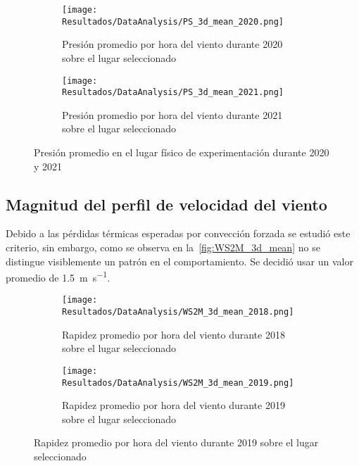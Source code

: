 			\begin{figure}[H]
				\centering
				\begin{subfigure}[t]{0.45\linewidth}
					\centering
					\texttt{[image: Resultados/DataAnalysis/PS\_3d\_mean\_2020.png]}
					\caption{Presión promedio por hora del viento durante 2020 sobre el lugar seleccionado}
					\label{fig:PS_3d_mean_2020}
				\end{subfigure}
				\hfill
				\begin{subfigure}[t]{0.45\linewidth}
					\centering
					\texttt{[image: Resultados/DataAnalysis/PS\_3d\_mean\_2021.png]}
					\caption{Presión promedio por hora del viento durante 2021 sobre el lugar seleccionado}
					\label{fig:PS_3d_mean_2021}
				\end{subfigure}
				\caption{Presión promedio en el lugar físico de experimentación durante 2020 y 2021}
				\label{fig:PS_3d_mean}
			\end{figure}
			
		\subsection{Magnitud del perfil de velocidad del viento}
		
			Debido a las pérdidas térmicas esperadas por convección forzada se estudió este criterio, sin embargo, como se observa en la~\cref{fig:WS2M_3d_mean} no se distingue visiblemente un patrón en el comportamiento. Se decidió usar un valor promedio de \qty{1.5}{\m\per\s}.
			
			\begin{figure}[H]
				\centering
				\begin{subfigure}[t]{0.45\linewidth}
					\centering
					\texttt{[image: Resultados/DataAnalysis/WS2M\_3d\_mean\_2018.png]}
					\caption{Rapidez promedio por hora del viento durante 2018 sobre el lugar seleccionado}
					\label{fig:WS2M_3d_mean_2018}
				\end{subfigure}
				\hfill
				\begin{subfigure}[t]{0.45\linewidth}
					\centering
					\texttt{[image: Resultados/DataAnalysis/WS2M\_3d\_mean\_2019.png]}
					\caption{Rapidez promedio por hora del viento durante 2019 sobre el lugar seleccionado}
					\label{fig:WS2M_3d_mean_2019}
				\end{subfigure}
			\end{figure}
			
